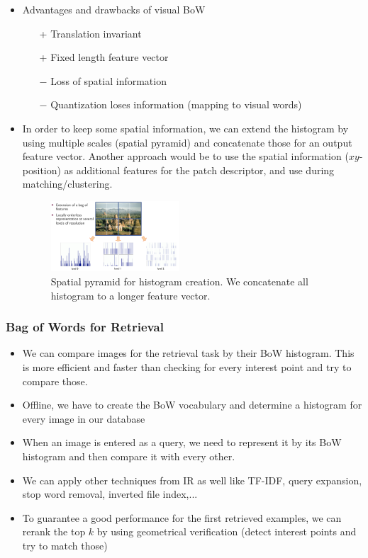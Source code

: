 \begin{itemize}
\begin{itemize}
	\end{itemize} 
	\item Advantages and drawbacks of visual BoW
	\begin{itemize}
		\item[+] Translation invariant
		\item[+] Fixed length feature vector 
		\item[$-$] Loss of spatial information
		\item[$-$] Quantization loses information (mapping to visual words)
	\end{itemize}
	\item In order to keep some spatial information, we can extend the histogram by using multiple scales (spatial pyramid) and concatenate those for an output feature vector. Another approach would be to use the spatial information ($xy$-position) as additional features for the patch descriptor, and use during matching/clustering.
	\begin{figure}[ht!]
		\centering
		\includegraphics[width=0.45\textwidth]{figures/cv_object_detection_BoW_spatial_pyramid.png}
		\caption{Spatial pyramid for histogram creation. We concatenate all histogram to a longer feature vector.}
		\label{fig:BoW_spatial_pyramid}
	\end{figure}
\end{itemize}
\subsubsection{Bag of Words for Retrieval}
\begin{itemize}
	\item We can compare images for the retrieval task by their BoW histogram. This is more efficient and faster than checking for every interest point and try to compare those.
	\item Offline, we have to create the BoW vocabulary and determine a histogram for every image in our database
	\item When an image is entered as a query, we need to represent it by its BoW histogram and then compare it with every other.
	\item We can apply other techniques from IR as well like TF-IDF, query expansion, stop word removal, inverted file index,...
	\item To guarantee a good performance for the first retrieved examples, we can rerank the top $k$ by using geometrical verification (detect interest points and try to match those)
\end{itemize}

